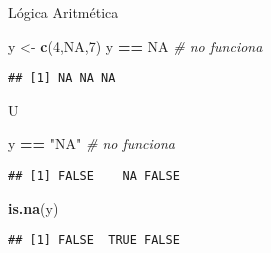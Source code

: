 \documentclass[ignorenonframetext,]{beamer}
\newenvironment{Shaded}{\begin{snugshade}}{\end{snugshade}}
\newcommand{\KeywordTok}[1]{\textcolor[rgb]{0.13,0.29,0.53}{\textbf{#1}}}
\newcommand{\DecValTok}[1]{\textcolor[rgb]{0.00,0.00,0.81}{#1}}
\newcommand{\StringTok}[1]{\textcolor[rgb]{0.31,0.60,0.02}{#1}}
\newcommand{\CommentTok}[1]{\textcolor[rgb]{0.56,0.35,0.01}{\textit{#1}}}
\newcommand{\OtherTok}[1]{\textcolor[rgb]{0.56,0.35,0.01}{#1}}
\newcommand{\OperatorTok}[1]{\textcolor[rgb]{0.81,0.36,0.00}{\textbf{#1}}}
\newcommand{\NormalTok}[1]{#1}
\begin{document}
\begin{frame}[fragile]{Lógica Aritmética}

\begin{Shaded}
\begin{Highlighting}[]
\NormalTok{y <-}\StringTok{ }\KeywordTok{c}\NormalTok{(}\DecValTok{4}\NormalTok{,}\OtherTok{NA}\NormalTok{,}\DecValTok{7}\NormalTok{)}
\NormalTok{y }\OperatorTok{==}\StringTok{ }\OtherTok{NA} \CommentTok{# no funciona}
\end{Highlighting}
\end{Shaded}

\begin{verbatim}
## [1] NA NA NA
\end{verbatim}

U

\begin{Shaded}
\begin{Highlighting}[]
\NormalTok{y }\OperatorTok{==}\StringTok{ "NA"} \CommentTok{# no funciona}
\end{Highlighting}
\end{Shaded}

\begin{verbatim}
## [1] FALSE    NA FALSE
\end{verbatim}

\begin{Shaded}
\begin{Highlighting}[]
\KeywordTok{is.na}\NormalTok{(y)}
\end{Highlighting}
\end{Shaded}

\begin{verbatim}
## [1] FALSE  TRUE FALSE
\end{verbatim}

\end{frame}
\end{document}
